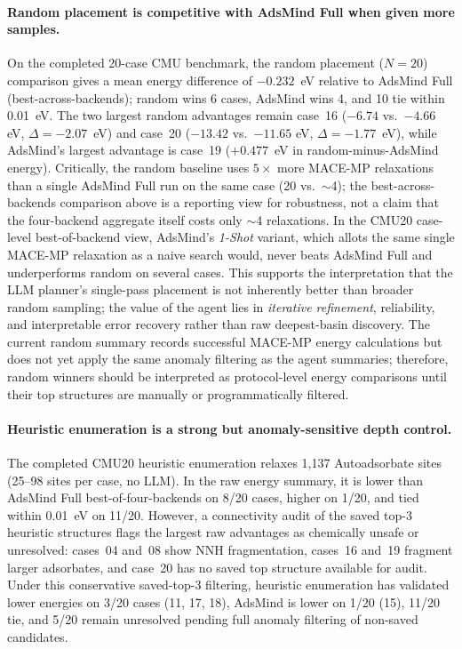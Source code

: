 \paragraph{Random placement is competitive with AdsMind Full when given more samples.}
On the completed 20-case CMU benchmark, the random placement ($N=20$) comparison gives a mean energy difference of $-0.232$~eV relative to AdsMind Full (best-across-backends); random wins 6 cases, AdsMind wins 4, and 10 tie within 0.01~eV.
The two largest random advantages remain case~16 ($-6.74$ vs.\ $-4.66$ eV, $\Delta = -2.07$~eV) and case~20 ($-13.42$ vs.\ $-11.65$ eV, $\Delta = -1.77$~eV), while AdsMind's largest advantage is case~19 ($+0.477$~eV in random-minus-AdsMind energy).
Critically, the random baseline uses $5\times$ more MACE-MP relaxations than a single AdsMind Full run on the same case (20 vs.\ $\sim$4); the best-across-backends comparison above is a reporting view for robustness, not a claim that the four-backend aggregate itself costs only $\sim$4 relaxations.
In the CMU20 case-level best-of-backend view, AdsMind's \textit{1-Shot} variant, which allots the same single MACE-MP relaxation as a naive search would, never beats AdsMind Full and underperforms random on several cases.
This supports the interpretation that the LLM planner's single-pass placement is not inherently better than broader random sampling; the value of the agent lies in \textit{iterative refinement}, reliability, and interpretable error recovery rather than raw deepest-basin discovery.
The current random summary records successful MACE-MP energy calculations but does not yet apply the same anomaly filtering as the agent summaries; therefore, random winners should be interpreted as protocol-level energy comparisons until their top structures are manually or programmatically filtered.

\paragraph{Heuristic enumeration is a strong but anomaly-sensitive depth control.}
The completed CMU20 heuristic enumeration relaxes 1{,}137 Autoadsorbate sites (25--98 sites per case, no LLM).
In the raw energy summary, it is lower than AdsMind Full best-of-four-backends on 8/20 cases, higher on 1/20, and tied within 0.01~eV on 11/20.
However, a connectivity audit of the saved top-3 heuristic structures flags the largest raw advantages as chemically unsafe or unresolved: cases~04 and~08 show NNH fragmentation, cases~16 and~19 fragment larger adsorbates, and case~20 has no saved top structure available for audit.
Under this conservative saved-top-3 filtering, heuristic enumeration has validated lower energies on 3/20 cases (11, 17, 18), AdsMind is lower on 1/20 (15), 11/20 tie, and 5/20 remain unresolved pending full anomaly filtering of non-saved candidates.

